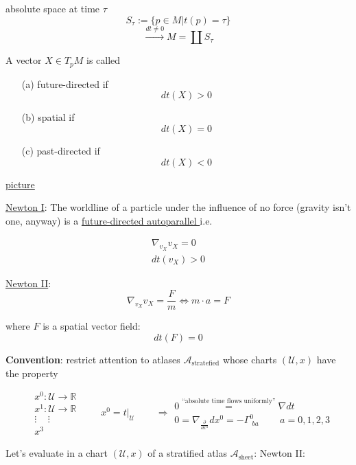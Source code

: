 \begin{definition}
  absolute space at time $\tau$ 
\[
S_{\tau} := \lbrace p\in M | t(p) = \tau \rbrace
\]
\[
\xrightarrow{ dt \neq 0 } M = \coprod S_{\tau}
\]
\end{definition}

\begin{definition} A vector $X \in T_p M$ is called 
\begin{enumerate}
\item[(a)] future-directed if 
\[
dt(X) > 0 
\]
\item[(b)] spatial if 
\[
dt(X) = 0 
\]
\item[(c)]
past-directed if 
\[
dt(X) < 0
\]
\end{enumerate}
\end{definition}

\underline{picture}

\underline{Newton I}: The worldline of a particle under the influence of no force (gravity isn't one, anyway) is a \underline{future-directed autoparallel } i.e.

\[
\begin{gathered}
  \nabla_{v_{X}} v_{X} = 0 \\
  dt(v_{X}) > 0 
\end{gathered}
\]

\underline{Newton II}: 
\[
\nabla_{v_{X}} v_X = \frac{F}{m} \Longleftrightarrow m \cdot a = F
\]


where $F$ is a spatial vector field:
\[
dt(F) = 0 
\]

\textbf{Convention}: restrict attention to atlases $\mathcal{A}_{\text{stratefied}}$ whose charts $(\mathcal{U}, x)$ have the property

\[
\begin{aligned}
  & x^0:\mathcal{U} \to \mathbb{R} \\ 
  & x^1: \mathcal{U} \to \mathbb{R} \\ 
  & \vdots \quad \, \vdots \\ 
  & x^3
\end{aligned}
\quad \quad \, 
x^0 = \left. t \right|_{\mathcal{U}}  \quad\quad \, \Longrightarrow \begin{gathered} 0 \overset{\text{``absolute time flows uniformly''} }{=} \nabla dt \\
0 = \nabla_{\frac{ \partial }{ \partial x^a} } dx^0 = - \Gamma_{ \, \, ba }^0 \quad \quad \, a = 0,1,2,3
\end{gathered}
\]

Let's evaluate in a chart $(\mathcal{U},x)$ of a stratified atlas $\mathcal{A}_{\text{sheet}}$: Newton II:


